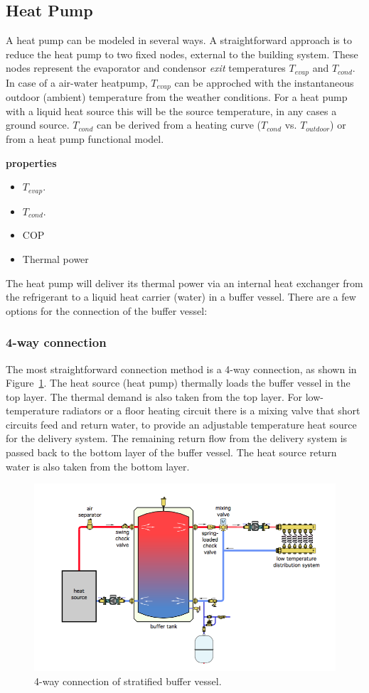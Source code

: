 \subsection{Heat Pump}

A heat pump can be modeled in several ways. A straightforward approach is to reduce the heat pump to two fixed nodes, external to the building system. These nodes represent the evaporator and condensor \emph{exit} temperatures $T_{evap}$ and $T_{cond}$. In case of a air-water heatpump, $T_{evap}$ can be approched with the instantaneous outdoor (ambient) temperature from the weather conditions. For a heat pump with a liquid heat source this will be the source temperature, in any cases a ground source. $T_{cond}$ can be derived from a heating curve ($T_{cond}$ vs. $T_{outdoor}$) or from a heat pump functional model.

\textbf{properties}
\begin{itemize}
	\item $T_{evap}$.
	\item $T_{cond}$. 
	\item COP
	\item Thermal power
\end{itemize}

The heat pump will deliver its thermal power via an internal heat exchanger from the refrigerant to a liquid heat carrier (water) in a buffer vessel. There are a few options for the connection of the buffer vessel:

\subsubsection{4-way connection}

The most straightforward connection method is a 4-way connection, as shown in Figure~\ref{fig:4way}. The heat source (heat pump) thermally loads the buffer vessel in the top layer. The thermal demand is also taken from the top layer. For low-temperature radiators or a floor heating circuit there is a mixing valve that short circuits feed and return water, to provide an adjustable temperature heat source for the delivery system. The remaining return flow from the delivery system is passed back to the bottom layer of the buffer vessel. The heat source return water is also taken from the bottom layer.

\begin{figure}[H]
	\centering
	\includegraphics[width=0.7\columnwidth]{Figures/4-way buffer connection}
	\caption[Short title]{4-way connection of stratified buffer vessel.}
	\label{fig:4way}
\end{figure} 

